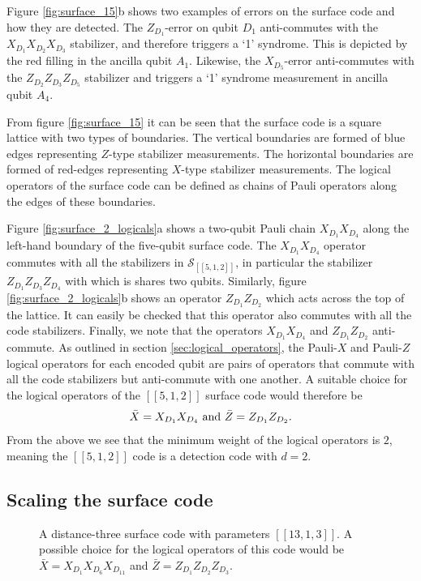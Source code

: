 \documentclass[]{arxiv}
\theoremstyle{plain}%
\theoremstyle{definition}
\theoremstyle{remark}
\begin{document}
Figure \ref{fig:surface_15}b shows two examples of errors on the surface code and how they are detected. The $Z_{D_1}$-error on qubit $D_1$ anti-commutes with the $X_{D_1}X_{D_2}X_{D_3}$ stabilizer, and therefore triggers a `1' syndrome. This is depicted by the red filling in the ancilla qubit $A_1$. Likewise, the $X_{D_5}$-error anti-commutes with the $Z_{D_2}Z_{D_3}Z_{D_5}$ stabilizer and triggers a `1' syndrome measurement in ancilla qubit $A_4$.

From figure \ref{fig:surface_15} it can be seen that the surface code is a square lattice with two types of boundaries. The vertical boundaries are formed of blue edges representing $Z$-type stabilizer measurements. The horizontal boundaries are formed of red-edges representing $X$-type stabilizer measurements. The logical operators of the surface code can be defined as chains of Pauli operators along the edges of these boundaries.

Figure \ref{fig:surface_2_logicals}a shows a two-qubit Pauli chain $X_{D_1}X_{D_4}$ along the left-hand boundary of the five-qubit surface code. The $X_{D_1}X_{D_4}$ operator commutes with all the stabilizers in $\mathcal{S}_{[[5,1,2]]}$, in particular the stabilizer $Z_{D_1}Z_{D_3}Z_{D_4}$ with which is shares two qubits. Similarly, figure \ref{fig:surface_2_logicals}b shows an operator $Z_{D_1}Z_{D_2}$ which acts across the top of the lattice. It can easily be checked that this operator also commutes with all the code stabilizers. Finally, we note that the operators $X_{D_1}X_{D_4}$ and $Z_{D_1}Z_{D_2}$ anti-commute. As outlined in section \ref{sec:logical_operators}, the Pauli-$X$ and Pauli-$Z$ logical operators for each encoded qubit are pairs of operators that commute with all the code stabilizers but anti-commute with one another. A suitable choice for the logical operators of the $[[5,1,2]]$ surface code would therefore be
%
\begin{equation}
\bar{X}=X_{D_1}X_{D_4} \ {\rm and} \ \bar{Z}=Z_{D_1}Z_{D_2}\rm.
\end{equation}
%
From the above we see that the minimum weight of the logical operators is $2$, meaning the $[[5,1,2]]$ code is a detection code with $d=2$.

\subsection{Scaling the surface code}

\begin{figure}
\centering

\caption{A distance-three surface code with parameters $[[13,1,3]]$. A possible choice for the logical operators of this code would be $\bar{X}=X_{D_1}X_{D_6}X_{D_{11}}$ and $\bar{Z}=Z_{D_1}Z_{D_2}Z_{D_3}$.}
\label{fig:surface_3}
\end{figure}
\end{document}
